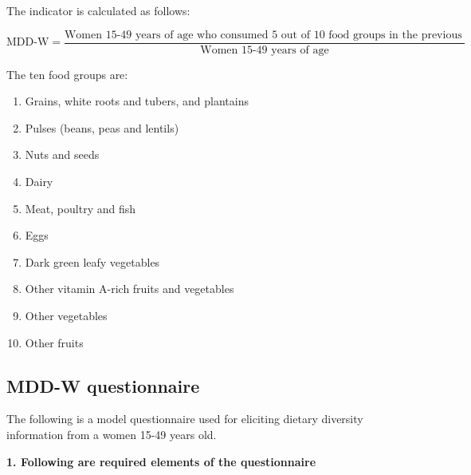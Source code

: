 \documentclass[12pt,]{book}
\providecommand{\tightlist}{%
  \setlength{\itemsep}{0pt}\setlength{\parskip}{0pt}}
\theoremstyle{definition}
\theoremstyle{definition}
\theoremstyle{definition}
\theoremstyle{remark}
\begin{document}
The indicator is calculated as follows:

\[ \text{MDD-W} = \frac{\text{Women 15-49 years of age who consumed 5 out of 10 food groups in the previous day or night}}{\text{Women 15-49 years of age}} \]

The ten food groups are:

\begin{enumerate}
\def\labelenumi{\arabic{enumi}.}
\tightlist
\item
  Grains, white roots and tubers, and plantains
\item
  Pulses (beans, peas and lentils)
\item
  Nuts and seeds
\item
  Dairy
\item
  Meat, poultry and fish
\item
  Eggs
\item
  Dark green leafy vegetables
\item
  Other vitamin A-rich fruits and vegetables
\item
  Other vegetables
\item
  Other fruits
\end{enumerate}

\hypertarget{mdd-w-questionnaire}{%
\subsection{MDD-W questionnaire}\label{mdd-w-questionnaire}}

The following is a model questionnaire used for eliciting dietary
diversity information from a women 15-49 years old.

\textbf{1. Following are required elements of the questionnaire}
\end{document}
